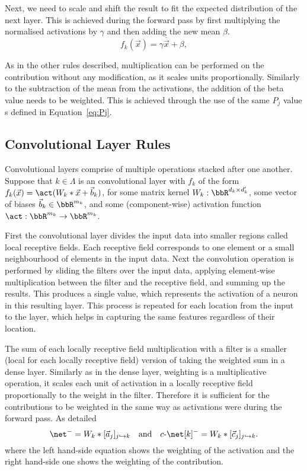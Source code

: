 Next, we need to scale and shift the result to fit the expected distribution of the next layer. This is achieved during the forward pass by first multiplying the normalised activations by $\gamma$ and then adding the new mean $\beta$. 
\begin{equation}
    f_k(\vec{x}) = \gamma \overline{\vec{x}} + \beta ,
\end{equation}

As in the other rules described, multiplication can be performed on the contribution without any modification, as it scales units proportionally. Similarly to the subtraction of the mean from the activations, the addition of the beta value needs to be weighted. This is achieved through the use of the same $P_j$ value s defined in Equation~\ref{eq:Pj}.




\subsection{Convolutional Layer Rules}
Convolutional layers comprise of multiple operations stacked after one another. Suppose that $k\in \Lambda$ is an convolutional layer with $f_k$ of the form $f_k(\vec{x})=\act(W_k\ast\vec{x} + \vec{b}_k)$, for some matrix kernel $W_k:\bbR^{d_k\times d_k'}$, some vector of biases $\vec{b}_k\in \bbR^{m_k}$, and some (component-wise) activation function $\act:\bbR^{m_k}\to \bbR^{m_k}$. 


First the convolutional layer divides the input data into smaller regions called local receptive fields. Each receptive field corresponds to one element or a small neighbourhood of elements in the input data. Next the convolution operation is performed by sliding the filters over the input data, applying element-wise multiplication between the filter and the receptive field, and summing up the results. This produces a single value, which represents the activation of a neuron in this resulting layer. This process is repeated for each location from the input to the layer, which helps in capturing the same features regardless of their location.

The sum of each locally receptive field multiplication with a filter is a smaller (local for each locally receptive field) version of taking the weighted sum in a dense layer. Similarly as in the dense layer, weighting is a multiplicative operation, it scales each unit of activation in a locally receptive field proportionally to the weight in the filter. Therefore it is sufficient for the contributions to be
weighted in the same way as activations were during the forward pass. As detailed
\begin{equation}
    \net^- = W_k\ast[\vec{a}_j]_{j\passto k}\quad\mbox{and}\quad
   \cnet^- = W_k\ast[\vec{c}_j]_{j\passto k}.
\end{equation}
where the left hand-side equation shows the weighting of the activation and the right hand-side one shows the weighting of the contribution.

